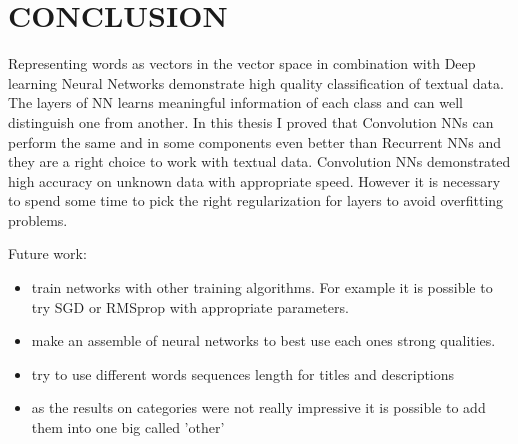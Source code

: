 \chapter*{CONCLUSION}						%


%

Representing words as vectors in the vector space in combination with Deep learning Neural Networks demonstrate high quality classification of textual data. The layers of NN learns meaningful information of each class and can well distinguish one from another. In this thesis I proved that Convolution NNs can perform the same and in some components even better than Recurrent NNs and they are a right choice to work with textual data. Convolution NNs demonstrated high accuracy on unknown data with appropriate speed. However it is necessary to spend some time to pick the right regularization for layers to avoid overfitting problems.

Future work:
\begin{itemize}
	\item train networks with other training algorithms. For example it is possible to try SGD or RMSprop with appropriate parameters. 
	\item make an assemble of neural networks to best use each ones strong qualities.
	\item try to use different words sequences length for titles and descriptions
	\item as the results on categories were not really impressive it is possible to add them into one big called 'other'  
\end{itemize}